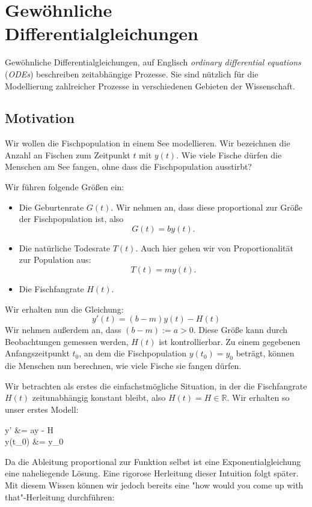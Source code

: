 \documentclass{report}
\newcommand*{\newpar}{\par\vspace{\baselineskip}\noindent}
\newcommand{\bR}{\mathbb{R}}
\begin{document}
\chapter{Gewöhnliche Differentialgleichungen}
Gewöhnliche Differentialgleichungen, auf Englisch \textit{ordinary differential equations} (\textit{ODEs}) beschreiben zeitabhängige Prozesse. Sie sind nützlich für die Modellierung zahlreicher Prozesse in verschiedenen Gebieten der Wissenschaft.
\section{Motivation}
Wir wollen die Fischpopulation in einem See modellieren. Wir bezeichnen die Anzahl an Fischen zum Zeitpunkt $t$ mit $y(t)$. Wie viele Fische dürfen die Menschen am See fangen, ohne dass die Fischpopulation ausstirbt?
\newpar
Wir führen folgende Größen ein:
\begin{itemize}
	\item Die Geburtenrate $G(t)$. Wir nehmen an, dass diese proportional zur Größe der Fischpopulation ist, also
	\[G(t) = b y(t).\]
	\item Die natürliche Todesrate $T(t)$. Auch hier gehen wir von Proportionalität zur Population aus:
	\[T(t) = m y(t).\]
	\item Die Fischfangrate $H(t)$.
\end{itemize}
Wir erhalten nun die Gleichung:
\[y'(t) = (b-m)y(t) - H(t)\]
Wir nehmen außerdem an, dass $(b-m) := a > 0$. Diese Größe kann durch Beobachtungen gemessen werden, $H(t)$ ist kontrollierbar. Zu einem gegebenen Anfangszeitpunkt $t_0$, an dem die Fischpopulation $y(t_0) = y_0$ beträgt, können die Menschen nun berechnen, wie viele Fische sie fangen dürfen.
\newpar
Wir betrachten als erstes die einfachstmögliche Situation, in der die Fischfangrate $H(t)$ zeitunabhängig konstant bleibt, also $H(t) = H \in \bR$. Wir erhalten so unser erstes Modell:
\begin{nalign}
	\label{eq:simplefishmodel}
	y' &= ay - H\\
	y(t_0) &= y_0\\
\end{nalign}
Da die Ableitung proportional zur Funktion selbst ist eine Exponentialgleichung eine naheliegende Lösung. Eine rigorose Herleitung dieser Intuition folgt später. Mit diesem Wissen können wir jedoch bereits eine "how would you come up with that"-Herleitung durchführen: 
%
%
%
%
%
%
%
%
%
%
%
%
%
%
%
\end{document}
